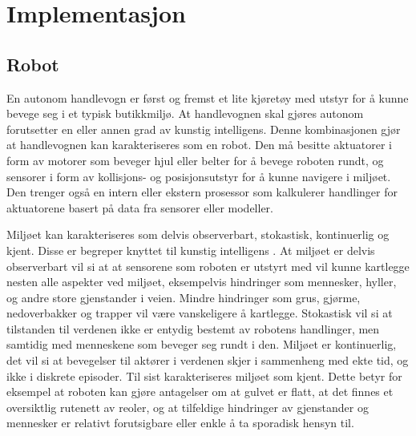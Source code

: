 
\chapter{Implementasjon} %

\label{ch:implementasjon} %



\section{Robot}

En autonom handlevogn er først og fremst et lite kjøretøy med utstyr for å kunne bevege seg i et typisk butikkmiljø.
At handlevognen skal gjøres autonom forutsetter en eller annen grad av kunstig intelligens. Denne kombinasjonen gjør
at handlevognen kan karakteriseres som en robot. Den må besitte aktuatorer  i form av motorer som beveger hjul eller belter for å bevege roboten rundt, og sensorer i
form av kollisjons- og posisjonsutstyr for å kunne navigere i miljøet. Den trenger også en intern eller ekstern prosessor
som kalkulerer handlinger for aktuatorene basert på data fra sensorer eller modeller.

Miljøet kan karakteriseres som delvis observerbart, stokastisk, kontinuerlig og kjent. Disse er begreper knyttet til
kunstig intelligens \cite{ai_modern_approach}. At miljøet er delvis observerbart vil si at at sensorene som roboten er utstyrt med vil kunne
kartlegge nesten alle aspekter ved miljøet, eksempelvis hindringer som mennesker, hyller, og andre store gjenstander
i veien. Mindre hindringer som grus, gjørme, nedoverbakker og trapper vil være vanskeligere å kartlegge. Stokastisk
vil si at tilstanden til verdenen ikke er entydig bestemt av robotens handlinger, men samtidig med menneskene som
beveger seg rundt i den. Miljøet er kontinuerlig, det vil si at bevegelser til aktører i verdenen skjer i sammenheng
med ekte tid, og ikke i diskrete episoder. Til sist karakteriseres miljøet som kjent. Dette betyr for eksempel at
roboten kan gjøre antagelser om at gulvet er flatt, at det finnes et oversiktlig rutenett av reoler, og at tilfeldige
hindringer av gjenstander og mennesker er relativt forutsigbare eller enkle å ta sporadisk hensyn til.

